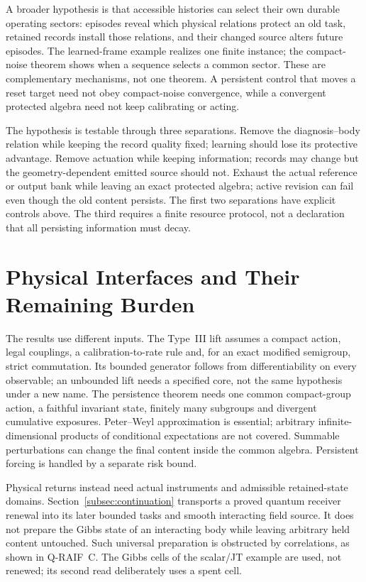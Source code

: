 \documentclass[12pt]{article}
\theoremstyle{definition}
\theoremstyle{remark}
\begin{document}
A broader hypothesis is that accessible histories can select their
own durable operating sectors: episodes reveal which physical
relations protect an old task, retained records install those
relations, and their changed source alters future episodes. The
learned-frame example realizes one finite instance; the compact-noise
theorem shows when a sequence selects a common sector. These are
complementary mechanisms, not one theorem. A persistent control that
moves a reset target need not obey compact-noise convergence, while
a convergent protected algebra need not keep calibrating or acting.

The hypothesis is testable through three separations. Remove the
diagnosis--body relation while keeping the record quality fixed;
learning should lose its protective advantage. Remove actuation
while keeping information; records may change but the
geometry-dependent emitted source should not. Exhaust the actual
reference or output bank while leaving an exact protected algebra;
active revision can fail even though the old content persists.
The first two separations have explicit controls above. The third
requires a finite resource protocol, not a declaration that all
persisting information must decay.

\section{Physical Interfaces and Their Remaining Burden}\label{sec:ledger}

The results use different inputs. The Type~III lift assumes a compact
action, legal couplings, a calibration-to-rate rule and, for an exact
modified semigroup, strict commutation. Its bounded generator follows
from differentiability on every observable; an unbounded lift needs a
specified core, not the same hypothesis under a new name.
The persistence theorem needs one common compact-group action,
a faithful invariant state, finitely many subgroups and divergent
cumulative exposures. Peter--Weyl approximation is essential; arbitrary
infinite-dimensional products of conditional expectations are not
covered. Summable perturbations can change the final content inside the
common algebra. Persistent forcing is handled by a separate risk bound.

Physical returns instead need actual instruments and admissible
retained-state domains. Section~\ref{subsec:continuation} transports
a proved quantum receiver renewal into its later bounded tasks and
smooth interacting field source. It does not prepare the Gibbs state
of an interacting body while leaving arbitrary held content untouched.
Such universal preparation is obstructed by correlations, as shown in
Q-RAIF~C. The Gibbs cells of the scalar/JT example are used, not
renewed; its second read deliberately uses a spent cell.
\end{document}
